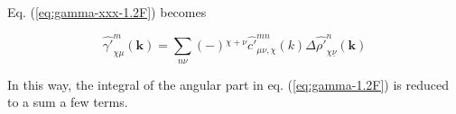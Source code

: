 Eq. (\ref{eq:gamma-xxx-1.2F}) becomes

\begin{equation}
\hat{\gamma'}_{\chi\mu}^{m}(\mathbf{k})=\sum_{n\nu}\left(-\right){}^{\chi+\nu}\hat{c'}_{\mu\nu,\chi}^{mn}(k)\Delta\hat{\rho'}_{\chi\underline{\nu}}^{n}(\mathbf{k})\label{eq:gamma-xxx-1-1.2F}
\end{equation}

In this way, the integral of the angular part in eq. (\ref{eq:gamma-1.2F})
is reduced to a sum a few terms.

